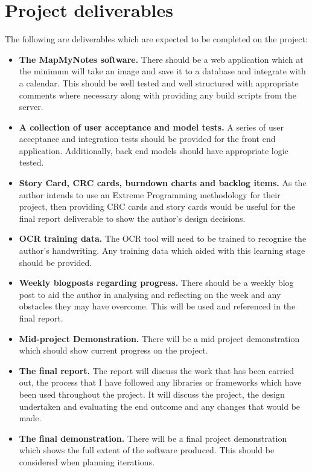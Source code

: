 \documentclass[11pt,fleqn,twoside]{article}
\begin{document}
\section{Project deliverables}
The following are deliverables which are expected to be completed on the project:
\begin{itemize}

  \item \textbf{The MapMyNotes software.} There should be a web application which at the minimum will take an image and save it to a database and integrate with a calendar. This should be well tested and well structured with appropriate comments where necessary along with providing any build scripts from the server.

  \item \textbf{A collection of user acceptance and model tests.} A series of user acceptance and integration tests should be provided for the front end application. Additionally, back end models should have appropriate logic tested.

  \item \textbf{Story Card, CRC cards, burndown charts and backlog items.} As the author intends to use an Extreme Programming methodology for their project, then providing CRC cards and story cards would be useful for the final report deliverable to show the author's design decisions.

  \item \textbf{OCR training data.} The OCR tool will need to be trained to recognise the author's handwriting. Any training data which aided with this learning stage should be provided.

  \item \textbf{Weekly blogposts regarding progress.} There should be a weekly blog post to aid the author in analysing and reflecting on the week and any obstacles they may have overcome. This will be used and referenced in the final report.

  \item \textbf{Mid-project Demonstration.} There will be a mid project demonstration which should show current progress on the project.

  \item \textbf{The final report.} The report will discuss the work that has been carried out, the process that I have followed any libraries or frameworks which have been used throughout the project. It will discuss the project, the design undertaken and evaluating the end outcome and any changes that would be made.

  \item \textbf{The final demonstration.} There will be a final project demonstration which shows the full extent of the software produced. This should be considered when planning iterations. 

\end{itemize}
\end{document}
